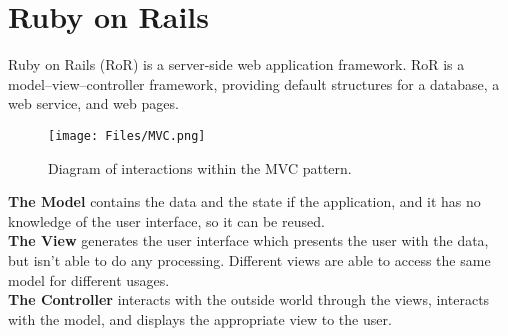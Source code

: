 \section{Ruby on Rails} 
\vspace{-5mm}
Ruby on Rails (RoR) is a server-side web application framework. RoR is a model–view–controller framework, providing default structures for a database, a web service, and web pages.\cite{wiki:RoR}

\begin{figure}[H]
	\centering
    \texttt{[image: Files/MVC.png]}
    \caption{Diagram of interactions within the MVC pattern.\cite{wiki:mvc} }
    \label{fig: MVC}
\end{figure}
\vspace{-3mm}

\textbf{The Model} contains the data and the state if the application, and it has no knowledge of the user interface, so it can be reused.\\
\textbf{The View} generates the user interface which presents the user with the data, but isn't able to do any processing. Different views are able to access the same model for different usages.\\
\textbf{The Controller} interacts with the outside world through the views, interacts with the model, and displays the appropriate view to the user.




